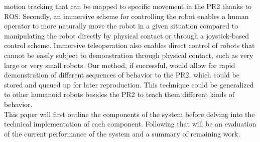 \documentclass{sig-alternate}
\begin{document}
motion tracking that can be mapped to specific movement in the PR2 thanks to ROS. Secondly, an immersive scheme for controlling the robot
enables a human operator to more naturally move the robot in a given situation compared to manipulating the robot directly by physical
contact or through a joystick-based control scheme. Immersive teleoperation also enables direct control of robots that cannot be easily
subject to demonstration through physical contact, such as very large or very small robots. Our method, if successful, would allow for rapid demonstration of different sequences of behavior to the PR2, which could be stored and queued up for later reproduction. This technique could be generalized to other humanoid robots besides the PR2 to teach them different kinds of behavior.\\
\indent This paper will first outline the components of the system before delving into the technical implementation of each component. Following that will be an evaluation of the current performance of the system and a summary of remaining work.	
\end{document}

